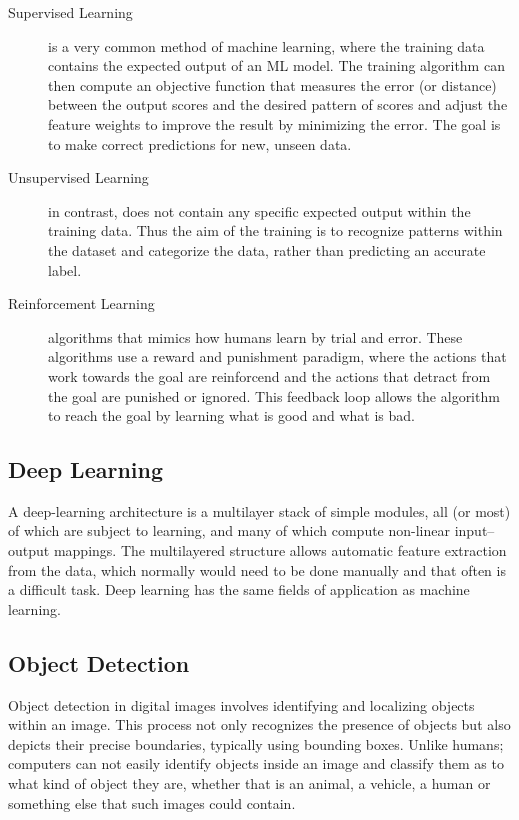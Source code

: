 \begin{description}
\item[Supervised Learning] is a very common method of machine learning, where the training data contains the expected output of an ML model. The training algorithm can then compute an objective function that measures the error (or distance) between the output scores and the desired pattern of scores \citep{deeplearning} and adjust the feature weights to improve the result by minimizing the error. The goal is to make correct predictions for new, unseen data.

\item[Unsupervised Learning] in contrast, does not contain any specific expected output within the training data. Thus the aim of the training is to recognize patterns within the dataset and categorize the data, rather than predicting an accurate label.

\item[Reinforcement Learning] algorithms that mimics how humans learn by trial and error. These algorithms use a reward and punishment paradigm, where the actions that work towards the goal are reinforcend and the actions that detract from the goal are punished or ignored. This feedback loop allows the algorithm to reach the goal by learning what is good and what is bad.

\end{description}


\subsection{Deep Learning}
A deep-learning architecture is a multilayer stack of simple modules, all (or most) of which are subject to learning, and many of which  compute non-linear input–output mappings. \citep{deeplearning} The multilayered structure allows automatic feature extraction from the data, which normally would need to be done manually and that often is a difficult task. Deep learning has the same fields of application as machine learning.

\subsection{Object Detection}

Object detection in digital images involves identifying and localizing objects within an image. This process not only recognizes the presence of objects but also depicts their precise boundaries, typically using bounding boxes. Unlike humans; computers can not easily identify objects inside an image and classify them as to what kind of object they are, whether that is an animal, a vehicle, a human or something else that such images could contain. 

